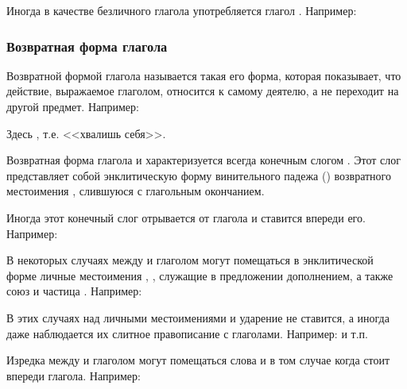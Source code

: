 \documentclass[11pt,a4paper,oneside]{memoir}
\begin{document}
    Иногда в качестве безличного глагола употребляется глагол {}. Например:
    
    \medskip{}

                \subsubsection{Возвратная форма глагола}

    Возвратной формой глагола называется такая его форма, которая показывает, что действие, выражаемое глаголом, относится к самому деятелю, а не переходит на другой предмет. Например:
    
    \bigskip{}

    Здесь {}, т.е. <<хвалишь себя>>.
    
    Возвратная форма глагола и характеризуется всегда конечным слогом {}. Этот слог {} представляет собой энклитическую форму винительного падежа  ({}) возвратного местоимения {}, слившуюся с глагольным окончанием.
    
    Иногда этот конечный слог {} отрывается от глагола и ставится впереди его. Например:
    
    \medskip{}
    
    В некоторых случаях между {} и глаголом могут помещаться в энклитической форме личные местоимения {}, {}, служащие в предложении дополнением, а также союз {} и частица {}. Например:
    
    \bigskip{}

    В этих случаях над личными местоимениями {} и {} ударение не ставится, а иногда даже наблюдается их слитное правописание с глаголами. Например: {} и т.п.
    
    Изредка между {} и глаголом могут помещаться слова и в том случае когда {} стоит впереди глагола. Например:
    
\end{document}
